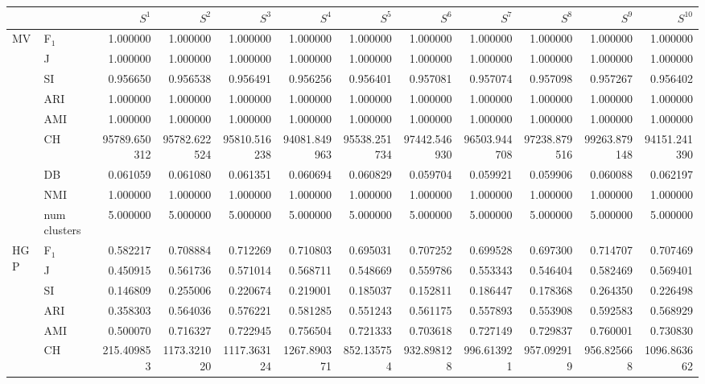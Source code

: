\begin{tabular}{llrrrrrrrrrr}
\toprule
 &  & $S^{1}$ & $S^{2}$ & $S^{3}$ & $S^{4}$ & $S^{5}$ & $S^{6}$ & $S^{7}$ & $S^{8}$ & $S^{9}$ & $S^{10}$ \\
\midrule
\multirow[c]{9}{*}{MV} & F$_1$ & 1.000000 & 1.000000 & 1.000000 & 1.000000 & 1.000000 & 1.000000 & 1.000000 & 1.000000 & 1.000000 & 1.000000 \\
 & J & 1.000000 & 1.000000 & 1.000000 & 1.000000 & 1.000000 & 1.000000 & 1.000000 & 1.000000 & 1.000000 & 1.000000 \\
 & SI & 0.956650 & 0.956538 & 0.956491 & 0.956256 & 0.956401 & 0.957081 & 0.957074 & 0.957098 & 0.957267 & 0.956402 \\
 & ARI & 1.000000 & 1.000000 & 1.000000 & 1.000000 & 1.000000 & 1.000000 & 1.000000 & 1.000000 & 1.000000 & 1.000000 \\
 & AMI & 1.000000 & 1.000000 & 1.000000 & 1.000000 & 1.000000 & 1.000000 & 1.000000 & 1.000000 & 1.000000 & 1.000000 \\
 & CH & 95789.650312 & 95782.622524 & 95810.516238 & 94081.849963 & 95538.251734 & 97442.546930 & 96503.944708 & 97238.879516 & 99263.879148 & 94151.241390 \\
 & DB & 0.061059 & 0.061080 & 0.061351 & 0.060694 & 0.060829 & 0.059704 & 0.059921 & 0.059906 & 0.060088 & 0.062197 \\
 & NMI & 1.000000 & 1.000000 & 1.000000 & 1.000000 & 1.000000 & 1.000000 & 1.000000 & 1.000000 & 1.000000 & 1.000000 \\
 & num clusters & 5.000000 & 5.000000 & 5.000000 & 5.000000 & 5.000000 & 5.000000 & 5.000000 & 5.000000 & 5.000000 & 5.000000 \\
\multirow[c]{9}{*}{HGP} & F$_1$ & 0.582217 & 0.708884 & 0.712269 & 0.710803 & 0.695031 & 0.707252 & 0.699528 & 0.697300 & 0.714707 & 0.707469 \\
 & J & 0.450915 & 0.561736 & 0.571014 & 0.568711 & 0.548669 & 0.559786 & 0.553343 & 0.546404 & 0.582469 & 0.569401 \\
 & SI & 0.146809 & 0.255006 & 0.220674 & 0.219001 & 0.185037 & 0.152811 & 0.186447 & 0.178368 & 0.264350 & 0.226498 \\
 & ARI & 0.358303 & 0.564036 & 0.576221 & 0.581285 & 0.551243 & 0.561175 & 0.557893 & 0.553908 & 0.592583 & 0.568929 \\
 & AMI & 0.500070 & 0.716327 & 0.722945 & 0.756504 & 0.721333 & 0.703618 & 0.727149 & 0.729837 & 0.760001 & 0.730830 \\
 & CH & 215.409853 & 1173.321020 & 1117.363124 & 1267.890371 & 852.135754 & 932.898128 & 996.613921 & 957.092919 & 956.825668 & 1096.863662 \\

\end{tabular}
